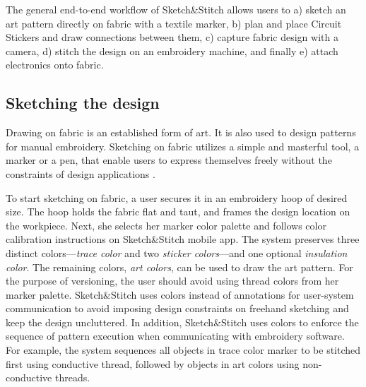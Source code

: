 \documentclass[header.tex]{subfiles}
\begin{document}
The general end-to-end workflow of Sketch\&Stitch allows users to a) sketch an art pattern directly on fabric with a textile marker, b) plan and place Circuit Stickers and draw connections between them, c) capture fabric design with a camera, d) stitch the design on an embroidery machine, and finally e) attach electronics onto fabric.





\subsection{Sketching the design}
Drawing on fabric is an established form of art. It is also used to design patterns for manual embroidery. 
Sketching on fabric utilizes a simple and masterful tool, a marker or a pen, that enable users to express themselves freely without the constraints of design applications \cite{schweikardt2000digital}. 


To start sketching on fabric, a user secures it in an embroidery hoop of desired size. The hoop holds the fabric flat and taut, and frames the design location on the workpiece. Next, she selects her marker color palette and follows color calibration instructions on Sketch\&Stitch mobile app. The system preserves three distinct colors---\textit{trace color} and two \textit{sticker colors}---and one optional \textit{insulation color}. The remaining colors, \textit{art colors}, can be used to draw the art pattern. For the purpose of versioning, the user should avoid using thread colors from her marker palette. Sketch\&Stitch uses colors instead of annotations for user-system communication to avoid imposing design constraints on freehand sketching and keep the design uncluttered. In addition, Sketch\&Stitch uses colors to enforce the sequence of pattern execution when communicating with embroidery software. For example, the system sequences all objects in trace color marker to be stitched first using conductive thread, followed by objects in art colors using non-conductive threads.
\end{document}
